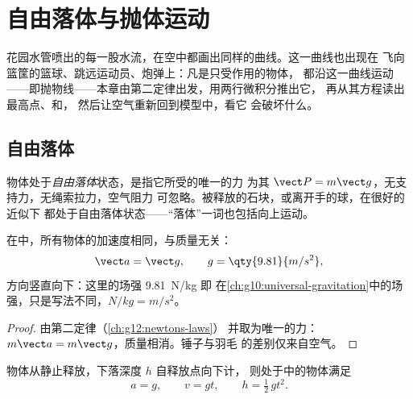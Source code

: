 \chapter{自由落体与抛体运动}\label{ch:g12:projectile-motion}

花园水管喷出的每一股水流，在空中都画出同样的曲线。这一曲线也出现在
飞向篮筐的篮球、跳远运动员、炮弹上：凡是只受作用的物体，
都沿这一曲线运动——即抛物线——本章由第二定律出发，用两行微积分推出它，
再从其方程读出最高点、和，
然后让空气重新回到模型中，看它
会破坏什么。

\section{自由落体}

\begin{definition}[自由落体]\label{def:g12:projectile-motion:freefall}
物体处于\emph{自由落体}状态，是指它所受的唯一的力
为其 $\vect P = m\vect g$，无支持力，无绳索拉力，空气阻力
可忽略。被释放的石块，或离开手的球，在很好的近似下
都处于自由落体状态——“落体”一词也包括向上运动。
\end{definition}

\begin{theorem}[伽利略自由落体定律]\label{thm:g12:projectile-motion:galileo}
在中，所有物体的加速度相同，与质量无关：
\[
\vect a = \vect g, \qquad g = \qty{9.81}{m/s^2},
\]
方向竖直向下：这里的场强 \qty{9.81}{N/kg} 即
在\cref{ch:g10:universal-gravitation}中的场强，只是写法不同，$\unit{N/kg} = \unit{m/s^2}$。
\end{theorem}

\begin{proof}
由第二定律（\cref{ch:g12:newtons-laws}）
并取为唯一的力：$m\vect a = m\vect g$，质量相消。锤子与羽毛
的差别仅来自空气。
\end{proof}

\begin{proposition}[从静止开始的竖直下落]\label{prop:g12:projectile-motion:vertical}
物体从静止释放，下落深度 $h$ 自释放点向下计，
则处于中的物体满足
\[
a = g, \qquad v = g t, \qquad h = \tfrac12\, g t^2 .
\]
\end{proposition}


